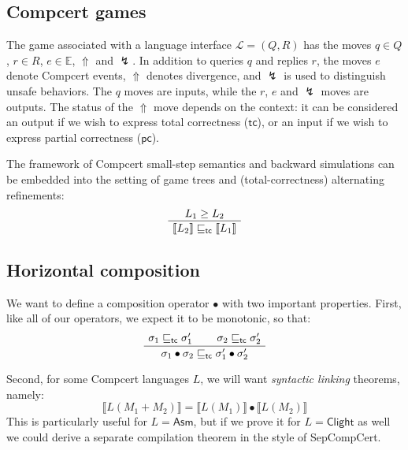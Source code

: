 \documentclass[11pt]{article}
\newcommand{\kw}[1]{{\mathsf{#1}}}
\begin{document}
\subsection{Compcert games}

The game associated with a language interface $\mathcal{L} = (Q, R)$
has the moves
$q \in Q$, $r \in R$, $e \in \mathbb{E}$, $\Uparrow$ and $\lightning$.
In addition to queries $q$ and replies $r$,
the moves $e$ denote Compcert events,
$\Uparrow$ denotes divergence,
and $\lightning$ is used to distinguish unsafe behaviors.
The $q$ moves are inputs,
while the $r$, $e$ and $\lightning$ moves are outputs.
The status of the $\Uparrow$ move depends on the context:
it can be considered
an output if we wish to express total correctness ($\kw{tc}$), or
an input if we wish to express partial correctness ($\kw{pc}$).

The framework of
Compcert small-step semantics and backward simulations
can be embedded into
the setting of game trees and (total-correctness) alternating refinements:
\begin{equation}
  \AxiomC{$L_1 \ge L_2$}
  \UnaryInfC{$\llbracket L_2 \rrbracket \sqsubseteq_\kw{tc} \llbracket L_1 \rrbracket$}
  \DisplayProof
  \label{eqn:hcompm}
\end{equation}

\subsection{Horizontal composition}

We want to define a composition operator $\bullet$
with two important properties.
First, like all of our operators,
we expect it to be monotonic, so that:
\begin{equation}
  \AxiomC{$\sigma_1 \sqsubseteq_\kw{tc} \sigma_1'$}
  \AxiomC{$\sigma_2 \sqsubseteq_\kw{tc} \sigma_2'$}
  \BinaryInfC{$\sigma_1 \bullet \sigma_2 \sqsubseteq_\kw{tc}
                \sigma_1' \bullet \sigma_2'$}
  \DisplayProof
  \label{eqn:embed}
\end{equation}

Second,
for some Compcert languages $L$,
we will want \emph{syntactic linking} theorems,
namely:
\begin{equation}
  \llbracket L(M_1 + M_2) \rrbracket =
  \llbracket L(M_1) \rrbracket \bullet
  \llbracket L(M_2) \rrbracket
  \label{eqn:slink}
\end{equation}
This is particularly useful for $L = \kw{Asm}$,
but if we prove it for $L = \kw{Clight}$ as well
we could derive a separate compilation theorem
in the style of SepCompCert.
\end{document}

